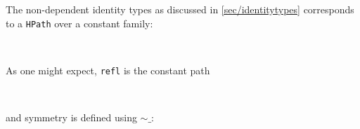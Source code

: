 The non-dependent identity types as discussed in \autoref{sec/identitytypes}
corresponds to a \texttt{HPath} over a constant family:
\begin{code}%
\>[0]\AgdaSpace{}%
\AgdaSymbol{:}\AgdaSpace{}%
\AgdaSymbol{\{}\AgdaSpace{}%
\AgdaSymbol{:}\AgdaSpace{}%
\AgdaSymbol{\}}\AgdaSpace{}%
\AgdaSpace{}%
\AgdaSpace{}%
\AgdaSpace{}%
\AgdaSpace{}%
\AgdaSpace{}%
\<%
\\
\>[0]\AgdaSpace{}%
\AgdaSymbol{\{}\AgdaSymbol{\}}\AgdaSpace{}%
\AgdaSpace{}%
\AgdaSpace{}%
\AgdaSymbol{=}\AgdaSpace{}%
\AgdaSpace{}%
\AgdaSpace{}%
\AgdaBound{\AgdaUnderscore{}}\AgdaSpace{}%
\AgdaSpace{}%
\AgdaSymbol{)}\AgdaSpace{}%
\AgdaSpace{}%
\<%
\end{code}

As one might expect, \texttt{refl} is the constant path
\begin{code}%
\>[0]\AgdaSpace{}%
\AgdaSymbol{:}\AgdaSpace{}%
\AgdaSymbol{\{}\AgdaSpace{}%
\AgdaSymbol{:}\AgdaSpace{}%
\AgdaSymbol{\}}\AgdaSpace{}%
\AgdaSpace{}%
\AgdaSpace{}%
\AgdaSpace{}%
\<%
\\
\>[0]\AgdaSpace{}%
\AgdaSymbol{\{}\AgdaSpace{}%
\AgdaSymbol{=}\AgdaSpace{}%
\AgdaSymbol{\}}\AgdaSpace{}%
\AgdaSymbol{=}\AgdaSpace{}%
\AgdaSpace{}%
\AgdaSpace{}%
\AgdaSpace{}%
\<%
\end{code}
and symmetry is defined using $\sim\_$:
\begin{code}%
\>[0]\AgdaSpace{}%
\AgdaSymbol{:}\AgdaSpace{}%
\AgdaSymbol{\{}\AgdaSpace{}%
\AgdaSpace{}%
\AgdaSymbol{:}\AgdaSpace{}%
\AgdaSymbol{\}}\AgdaSpace{}%
\AgdaSpace{}%
\AgdaSpace{}%
\AgdaSpace{}%
\AgdaSpace{}%
\AgdaSpace{}%
\AgdaSpace{}%
\AgdaSpace{}%
\<%
\\
\>[0]\AgdaSpace{}%
\AgdaSpace{}%
\AgdaSymbol{=}\AgdaSpace{}%
\AgdaSpace{}%
\AgdaSpace{}%
\AgdaSpace{}%
\AgdaSpace{}%
\AgdaSymbol{(}\AgdaOperator{\AgdaPrimitive{\textasciitilde{}}}\AgdaSpace{}%
\AgdaSymbol{)}\<%
\end{code}

